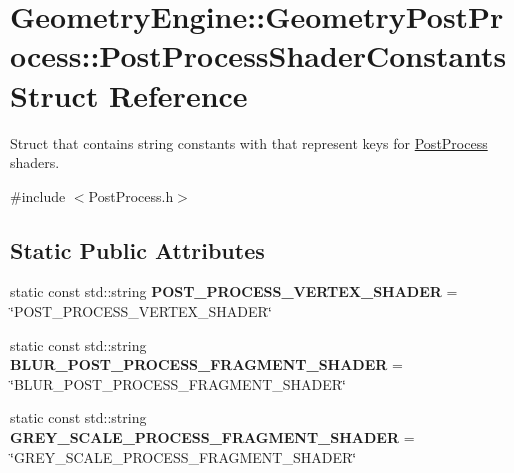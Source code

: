 \hypertarget{struct_geometry_engine_1_1_geometry_post_process_1_1_post_process_shader_constants}{}\section{Geometry\+Engine\+::Geometry\+Post\+Process\+::Post\+Process\+Shader\+Constants Struct Reference}
\label{struct_geometry_engine_1_1_geometry_post_process_1_1_post_process_shader_constants}


Struct that contains string constants with that represent keys for \mbox{\hyperlink{class_geometry_engine_1_1_geometry_post_process_1_1_post_process}{Post\+Process}} shaders.  




{\ttfamily \#include $<$Post\+Process.\+h$>$}

\subsection*{Static Public Attributes}
\begin{DoxyCompactItemize}
\item 
\mbox{\label{struct_geometry_engine_1_1_geometry_post_process_1_1_post_process_shader_constants_a40391643312d557a9a45d0776aaa802d}} 
static const std\+::string {\bfseries P\+O\+S\+T\+\_\+\+P\+R\+O\+C\+E\+S\+S\+\_\+\+V\+E\+R\+T\+E\+X\+\_\+\+S\+H\+A\+D\+ER} = \char`\"{}P\+O\+S\+T\+\_\+\+P\+R\+O\+C\+E\+S\+S\+\_\+\+V\+E\+R\+T\+E\+X\+\_\+\+S\+H\+A\+D\+ER\char`\"{}
\item 
\mbox{\label{struct_geometry_engine_1_1_geometry_post_process_1_1_post_process_shader_constants_a74a405745cb32286982fd79c0b69e354}} 
static const std\+::string {\bfseries B\+L\+U\+R\+\_\+\+P\+O\+S\+T\+\_\+\+P\+R\+O\+C\+E\+S\+S\+\_\+\+F\+R\+A\+G\+M\+E\+N\+T\+\_\+\+S\+H\+A\+D\+ER} = \char`\"{}B\+L\+U\+R\+\_\+\+P\+O\+S\+T\+\_\+\+P\+R\+O\+C\+E\+S\+S\+\_\+\+F\+R\+A\+G\+M\+E\+N\+T\+\_\+\+S\+H\+A\+D\+ER\char`\"{}
\item 
\mbox{\label{struct_geometry_engine_1_1_geometry_post_process_1_1_post_process_shader_constants_ae5a4ecab856cf234ca03ebd5ea883d53}} 
static const std\+::string {\bfseries G\+R\+E\+Y\+\_\+\+S\+C\+A\+L\+E\+\_\+\+P\+R\+O\+C\+E\+S\+S\+\_\+\+F\+R\+A\+G\+M\+E\+N\+T\+\_\+\+S\+H\+A\+D\+ER} = \char`\"{}G\+R\+E\+Y\+\_\+\+S\+C\+A\+L\+E\+\_\+\+P\+R\+O\+C\+E\+S\+S\+\_\+\+F\+R\+A\+G\+M\+E\+N\+T\+\_\+\+S\+H\+A\+D\+ER\char`\"{}
\end{DoxyCompactItemize}


